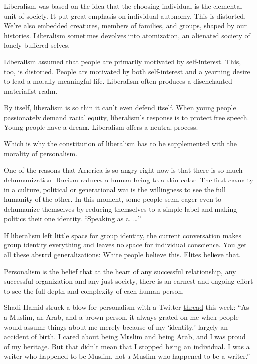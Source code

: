 Liberalism was based on the idea that the choosing individual is the
elemental unit of society. It put great emphasis on individual autonomy.
This is distorted. We're also embedded creatures, members of families,
and groups, shaped by our histories. Liberalism sometimes devolves into
atomization, an alienated society of lonely buffered selves.

Liberalism assumed that people are primarily motivated by self-interest.
This, too, is distorted. People are motivated by both self-interest and
a yearning desire to lead a morally meaningful life. Liberalism often
produces a disenchanted materialist realm.

By itself, liberalism is so thin it can't even defend itself. When young
people passionately demand racial equity, liberalism's response is to
protect free speech. Young people have a dream. Liberalism offers a
neutral process.

Which is why the constitution of liberalism has to be supplemented with
the morality of personalism.

One of the reasons that America is so angry right now is that there is
so much dehumanization. Racism reduces a human being to a skin color.
The first casualty in a culture, political or generational war is the
willingness to see the full humanity of the other. In this moment, some
people seem eager even to dehumanize themselves by reducing themselves
to a simple label and making politics their one identity. ``Speaking as
a. \ldots''

If liberalism left little space for group identity, the current
conversation makes group identity everything and leaves no space for
individual conscience. You get all these absurd generalizations: White
people believe this. Elites believe that.

Personalism is the belief that at the heart of any successful
relationship, any successful organization and any just society, there is
an earnest and ongoing effort to see the full depth and complexity of
each human person.

Shadi Hamid struck a blow for personalism with a Twitter
\href{https://twitter.com/shadihamid/status/1280635678506856448}{thread}
this week: ``As a Muslim, an Arab, and a brown person, it always grated
on me when people would assume things about me merely because of my
`identity,' largely an accident of birth. I cared about being Muslim and
being Arab, and I was proud of my heritage. But that didn't mean that I
stopped being an individual. I was a writer who happened to be Muslim,
not a Muslim who happened to be a writer.''

